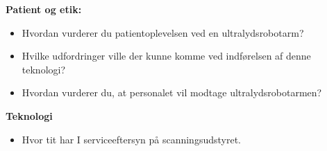 \textbf{Patient og etik:}
\begin{itemize}
\item Hvordan vurderer du patientoplevelsen ved en ultralydsrobotarm?
\item Hvilke udfordringer ville der kunne komme ved indførelsen af denne teknologi? 
\item Hvordan vurderer du, at personalet vil modtage ultralydsrobotarmen?
\end{itemize}
\textbf{Teknologi}
\begin{itemize}
\item Hvor tit har I serviceeftersyn på scanningsudstyret.
\end{itemize}
\newpage